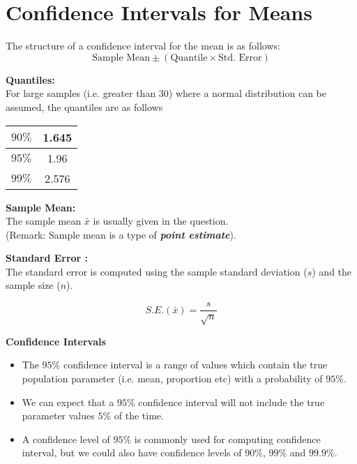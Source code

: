 \documentclass[]{report}
\begin{document}











\section{Confidence Intervals for Means}

The structure of a confidence interval for the mean is as follows:
\[ \mbox{Sample Mean} \pm  \left( \mbox{Quantile} \times \mbox{Std. Error}  \right) \]


\noindent \textbf{Quantiles:}\\
For large samples (i.e. greater than 30) where a normal distribution can be assumed, the quantiles 
are as follows\\ \bigskip
\begin{center}
\begin{tabular}{|c|c|}
\hline  $90\%$  &   1.645  \\ 
\hline  $95\%$  &   1.96  \\
\hline  $99\%$  &   2.576 \\ 
\hline 
\end{tabular} 
\end{center}


\noindent \textbf{Sample Mean:}\\
The sample mean $\bar{x}$ is usually given in the question.
\\ \bigskip
(Remark: Sample mean is a type of \textbf{\textit{point estimate}}).


\noindent \textbf{Standard Error :}\\
The standard error is computed using the sample standard deviation ($s$) and the sample size ($n$).

\[ S.E. (\bar{x}) = \frac{s}{\sqrt{n}} \]













\textbf{Confidence Intervals}

\begin{itemize}
\item The $95\%$ confidence interval is a range of values which contain the true population parameter (i.e. mean, proportion etc) with a probability of $95\%$.
\item We can expect that a $95\%$ confidence interval will not include the true parameter values $5\%$ of the time.
\item A confidence level of $95\%$ is commonly used for computing confidence interval, but we could also have confidence levels of $90\%$, $99\%$ and $99.9\%$.
\end{itemize}
\end{document}
